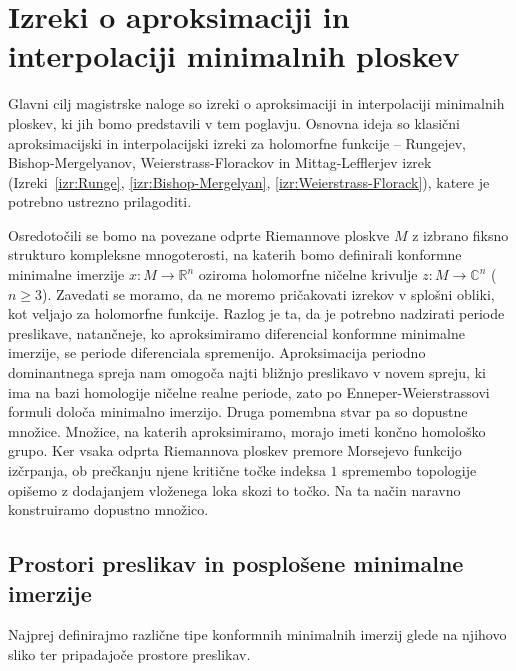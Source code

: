 \documentclass[12pt,a4paper,twoside]{article}
\theoremstyle{definition} %
\theoremstyle{plain} %
\numberwithin{equation}{section}  %
\begin{document}
\section{Izreki o aproksimaciji in interpolaciji minimalnih ploskev}

Glavni cilj magistrske naloge so izreki o aproksimaciji in interpolaciji minimalnih ploskev, ki jih bomo predstavili v tem poglavju. Osnovna ideja so klasični aproksimacijski in interpolacijski izreki za holomorfne funkcije -- Rungejev, Bishop-Mergelyanov, Weierstrass-Florackov in Mittag-Lefflerjev izrek (Izreki~\ref{izr:Runge}, \ref{izr:Bishop-Mergelyan}, \ref{izr:Weierstrass-Florack}), katere je potrebno ustrezno prilagoditi.

Osredotočili se bomo na povezane odprte Riemannove ploskve $M$ z izbrano fiksno strukturo kompleksne mnogoterosti, na katerih bomo definirali konformne minimalne imerzije $x \colon M \to \mathbb{R}^{n}$ oziroma holomorfne ničelne krivulje $z \colon M \to \mathbb{C}^{n}$ ($n \geq 3$).
Zavedati se moramo, da ne moremo pričakovati izrekov v splošni obliki, kot veljajo za holomorfne funkcije. Razlog je ta, da je potrebno nadzirati periode preslikave, natančneje, ko aproksimiramo diferencial konformne minimalne imerzije, se periode diferenciala spremenijo. Aproksimacija periodno dominantnega spreja nam omogoča najti bližnjo preslikavo v novem spreju, ki ima na bazi homologije ničelne realne periode, zato po Enneper-Weierstrassovi formuli določa minimalno imerzijo.
Druga pomembna stvar pa so dopustne množice. Množice, na katerih aproksimiramo, morajo imeti končno homološko grupo. Ker vsaka odprta Riemannova ploskev premore Morsejevo funkcijo izčrpanja, ob prečkanju njene kritične točke indeksa $1$ spremembo topologije opišemo z dodajanjem vloženega loka skozi to točko. Na ta način naravno konstruiramo dopustno množico.

\subsection{Prostori preslikav in posplošene minimalne imerzije}
%
Najprej definirajmo različne tipe konformnih minimalnih imerzij glede na njihovo sliko ter pripadajoče prostore preslikav.
\end{document}
